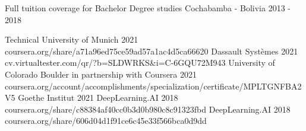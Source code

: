 

\begin{cvhonors}
  {Full tuition coverage for Bachelor Degree studies}
  {Cochabamba - Bolivia}
  {2013 - 2018}
  {}
\end{cvhonors}

\begin{cvcertificates}
    {Technical University of Munich}
    {2021}
    {coursera.org/share/a71a96ed75ce59ad57a1ac4d5ca66620}
    {Dassault Syst\`emes}
    {2021}
    {cv.virtualtester.com/qr/?b=SLDWRKS\&i=C-6GQU72M943}
    {University of Colorado Boulder in partnership with Coursera}
    {2021}
    {coursera.org/account/accomplishments/specialization/certificate/MPLTGNFBA2V5}
    {Goethe Institut}
    {2021}
    {}
    {DeepLearning.AI}
    {2018}
    {coursera.org/share/c88384af40cc0b3d0b980c8c91323fbd}
    {DeepLearning.AI}
    {2018}
    {coursera.org/share/606d04d1f91ce6c45e33f566bca0d9dd}
\end{cvcertificates}

